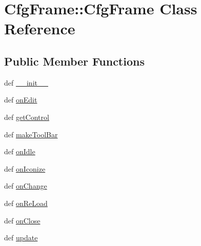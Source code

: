 \hypertarget{classCfgFrame_1_1CfgFrame}{
\section{CfgFrame::CfgFrame Class Reference}
\label{classCfgFrame_1_1CfgFrame}
}
\subsection*{Public Member Functions}
\begin{DoxyCompactItemize}
\item 
def \hyperlink{classCfgFrame_1_1CfgFrame_ade76b3c75ebbea57217775c9849493b2}{\_\-\_\-init\_\-\_\-}
\item 
def \hyperlink{classCfgFrame_1_1CfgFrame_aa3c4dde8c6f9e2b22e98510c177992de}{onEdit}
\item 
def \hyperlink{classCfgFrame_1_1CfgFrame_a1a170349dd0f885911c6a5dc05f0568b}{getControl}
\item 
def \hyperlink{classCfgFrame_1_1CfgFrame_ae69c002127bc6913ea33be65aebd08a2}{makeToolBar}
\item 
def \hyperlink{classCfgFrame_1_1CfgFrame_a07409ab0756ec5f1cc5a5f12b6ef6af0}{onIdle}
\item 
def \hyperlink{classCfgFrame_1_1CfgFrame_ab437de758da4163a93d63b20ed9eb446}{onIconize}
\item 
def \hyperlink{classCfgFrame_1_1CfgFrame_a1c2999d11c0bf12c3bf3a532c1aab624}{onChange}
\item 
def \hyperlink{classCfgFrame_1_1CfgFrame_a93a31956d0d1c94648a4f786e2321e7f}{onReLoad}
\item 
def \hyperlink{classCfgFrame_1_1CfgFrame_a54ab916bfd9fa479de45ed9f3e62bffb}{onClose}
\item 
def \hyperlink{classCfgFrame_1_1CfgFrame_a6c8549da5a53c3f4a25a2811a8b864c6}{update}
\end{DoxyCompactItemize}
